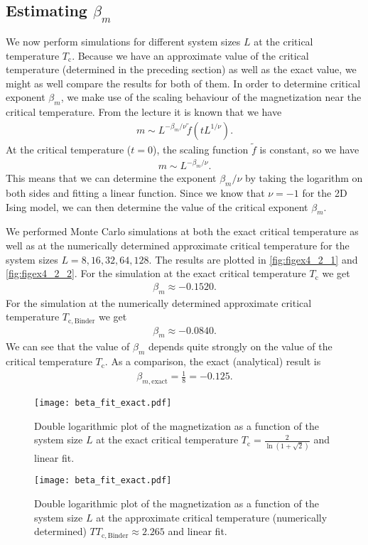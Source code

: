 \documentclass[a4paper,10pt,bibtotoc]{scrartcl}
\begin{document}
\subsection{Estimating $\beta_m$}
We now perform simulations for different system sizes $L$ at the critical temperature $T_\mathrm{c}$.
Because we have an approximate value of the critical temperature (determined in the preceding section) as well as the exact value, we might as well compare the results for both of them.
In order to determine critical exponent $\beta_m$, we make use of the scaling behaviour of the magnetization near the critical temperature.
From the lecture it is known that we have
\begin{align}
m\sim L^{-\beta_m/\nu}\tilde{f}\left(tL^{1/\nu}\right).
\end{align}
At the critical temperature ($t=0$), the scaling function $\tilde{f}$ is constant, so we have
\begin{align}
m\sim L^{-\beta_m/\nu}.
\end{align}
This means that we can determine the exponent $\beta_m/\nu$ by taking the logarithm on both sides and fitting a linear function. 
Since we know that $\nu=-1$ for the 2D Ising model, we can then determine the value of the critical exponent $\beta_m$. 

We performed Monte Carlo simulations at both the exact critical temperature as well as at the numerically determined approximate critical temperature for the system sizes $L=8,16,32,64,128$.
The results are plotted in \autoref{fig:figex4_2_1} and \autoref{fig:figex4_2_2}.
For the simulation at the exact critical temperature $T_\mathrm{c}$ we get
\begin{align}
\beta_m\approx -0.1520.
\end{align}
For the simulation at the numerically determined approximate critical temperature $T_\mathrm{c,Binder}$ we get
\begin{align}
\beta_m\approx -0.0840.
\end{align}
We can see that the value of $\beta_m$ depends quite strongly on the value of the critical temperature $T_\mathrm{c}$.
As a comparison, the exact (analytical) result is
\begin{align}
\beta_{m,\mathrm{exact}} = \frac{1}{8} = -0.125.
\end{align}


\begin{figure}[H]
	\centering
	\texttt{[image: beta\_fit\_exact.pdf]}
	\caption{Double logarithmic plot of the magnetization as a function of the system size $L$ at the exact critical temperature $T_\mathrm{c} = \frac{2}{\ln\left(1+\sqrt{2}\right)}$ and linear fit.}
	\label{fig:figex4_2_1}
	\texttt{[image: beta\_fit\_exact.pdf]}
	\caption{Double logarithmic plot of the magnetization as a function of the system size $L$ at the approximate critical temperature (numerically determined) $TT_\mathrm{c, Binder} \approx 2.265$ and linear fit.}
	\label{fig:figex4_2_2}
\end{figure}
\end{document}
